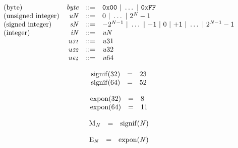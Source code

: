 \vspace{1ex}

\vspace{1ex}

$$
\begin{array}{@{}lrrl@{}l@{}}
\mbox{(byte)} & {\mathit{byte}} &::=& \mathtt{0x00} ~|~ \dots ~|~ \mathtt{0xFF} \\
\mbox{(unsigned integer)} & {{\mathit{u}}}{{\mathit{N}}} &::=& 0 ~|~ \dots ~|~ {2^{{\mathit{N}}}} - 1 \\
\mbox{(signed integer)} & {{\mathit{s}}}{{\mathit{N}}} &::=& {-{2^{{\mathit{N}} - 1}}} ~|~ \dots ~|~ {-1} ~|~ 0 ~|~ {+1} ~|~ \dots ~|~ {2^{{\mathit{N}} - 1}} - 1 \\
\mbox{(integer)} & {{\mathit{i}}}{{\mathit{N}}} &::=& {{\mathit{u}}}{{\mathit{N}}} \\
& {\mathit{u{\scriptstyle31}}} &::=& {{\mathit{u}}}{31} \\
& {\mathit{u{\scriptstyle32}}} &::=& {{\mathit{u}}}{32} \\
& {\mathit{u{\scriptstyle64}}} &::=& {{\mathit{u}}}{64} \\
\end{array}
$$

\vspace{1ex}

$$
\begin{array}{@{}lcl@{}l@{}}
{\mathrm{signif}}(32) &=& 23 &  \\
{\mathrm{signif}}(64) &=& 52 &  \\
\end{array}
$$

$$
\begin{array}{@{}lcl@{}l@{}}
{\mathrm{expon}}(32) &=& 8 &  \\
{\mathrm{expon}}(64) &=& 11 &  \\
\end{array}
$$

$$
\begin{array}{@{}lcl@{}l@{}}
{{\mathrm{M}}}_{{\mathit{N}}} &=& {\mathrm{signif}}({\mathit{N}}) &  \\
\end{array}
$$

$$
\begin{array}{@{}lcl@{}l@{}}
{{\mathrm{E}}}_{{\mathit{N}}} &=& {\mathrm{expon}}({\mathit{N}}) &  \\
\end{array}
$$

